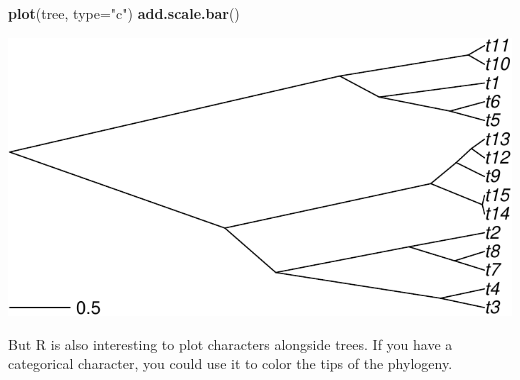 \documentclass[
]{book}
\newenvironment{Shaded}{\begin{snugshade}}{\end{snugshade}}
\newcommand{\AttributeTok}[1]{\textcolor[rgb]{0.13,0.29,0.53}{#1}}
\newcommand{\FunctionTok}[1]{\textcolor[rgb]{0.13,0.29,0.53}{\textbf{#1}}}
\newcommand{\NormalTok}[1]{#1}
\newcommand{\StringTok}[1]{\textcolor[rgb]{0.31,0.60,0.02}{#1}}
\begin{document}
\begin{Shaded}
\begin{Highlighting}[]
\FunctionTok{plot}\NormalTok{(tree, }\AttributeTok{type=}\StringTok{"c"}\NormalTok{)}
\FunctionTok{add.scale.bar}\NormalTok{()}
\end{Highlighting}
\end{Shaded}

\includegraphics{pcm-workshop_files/figure-latex/Basic tree plotting-1.pdf}

But R is also interesting to plot characters alongside trees. If you have a categorical character, you could use it to color the tips of the phylogeny.
\end{document}
